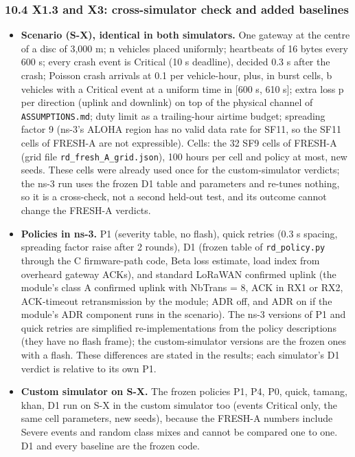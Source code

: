 \subsubsection*{10.4 X1.3 and X3: cross-simulator check and added baselines}
\begin{itemize}
\item \textbf{Scenario (S-X), identical in both simulators.} One gateway at the centre of a disc of 3,000 m; n vehicles placed uniformly; heartbeats of 16 bytes every 600 s; every crash event is Critical (10 s deadline), decided 0.3 s after the crash; Poisson crash arrivals at 0.1 per vehicle-hour, plus, in burst cells, b vehicles with a Critical event at a uniform time in [600 s, 610 s]; extra loss p per direction (uplink and downlink) on top of the physical channel of \texttt{ASSUMPTIONS.md}; duty limit as a trailing-hour airtime budget; spreading factor 9 (ns-3's ALOHA region has no valid data rate for SF11, so the SF11 cells of FRESH-A are not expressible). Cells: the 32 SF9 cells of FRESH-A (grid file \texttt{rd\_fresh\_A\_grid.json}), 100 hours per cell and policy at most, new seeds. These cells were already used once for the custom-simulator verdicts; the ns-3 run uses the frozen D1 table and parameters and re-tunes nothing, so it is a cross-check, not a second held-out test, and its outcome cannot change the FRESH-A verdicts.
\item \textbf{Policies in ns-3.} P1 (severity table, no flash), quick retries (0.3 s spacing, spreading factor raise after 2 rounds), D1 (frozen table of \texttt{rd\_policy.py} through the C firmware-path code, Beta loss estimate, load index from overheard gateway ACKs), and standard LoRaWAN confirmed uplink (the module's class A confirmed uplink with NbTrans = 8, ACK in RX1 or RX2, ACK-timeout retransmission by the module; ADR off, and ADR on if the module's ADR component runs in the scenario). The ns-3 versions of P1 and quick retries are simplified re-implementations from the policy descriptions (they have no flash frame); the custom-simulator versions are the frozen ones with a flash. These differences are stated in the results; each simulator's D1 verdict is relative to its own P1.
\item \textbf{Custom simulator on S-X.} The frozen policies P1, P4, P0, quick, tamang, khan, D1 run on S-X in the custom simulator too (events Critical only, the same cell parameters, new seeds), because the FRESH-A numbers include Severe events and random class mixes and cannot be compared one to one. D1 and every baseline are the frozen code.

\end{itemize}
